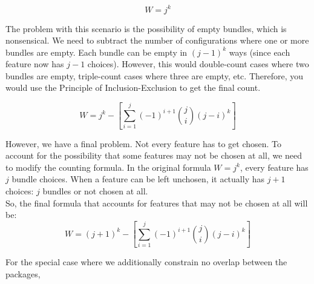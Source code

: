 \documentclass{article}
\begin{document}
\[
W = j^k 
\]

The problem with this scenario is the possibility of empty bundles, which is nonsensical. We need to subtract the number of configurations where one or more bundles are empty. Each bundle can be empty in \( (j-1)^k \) ways (since each feature now has \( j-1 \) choices). However, this would double-count cases where two bundles are empty, triple-count cases where three are empty, etc. Therefore, you would use the Principle of Inclusion-Exclusion to get the final count.

\[
W = j^k - \left[ \sum_{i=1}^{j} (-1)^{i+1} \binom{j}{i} (j-i)^k \right]
\]

However, we have a final problem. Not every feature has to get chosen. 
To account for the possibility that some features may not be chosen at all, we need to modify the counting formula. In the original formula \( W = j^k \), every feature has \( j \) bundle choices. When a feature can be left unchosen, it actually has \( j+1 \) choices: \( j \) bundles or not chosen at all. \\

So, the final formula that accounts for features that may not be chosen at all will be:
\[
W = (j + 1)^k - \left[ \sum_{i=1}^{j} (-1)^{i+1} \binom{j}{i} (j-i)^k \right]
\]

For the special case where we additionally constrain no overlap between the packages,
\end{document}
